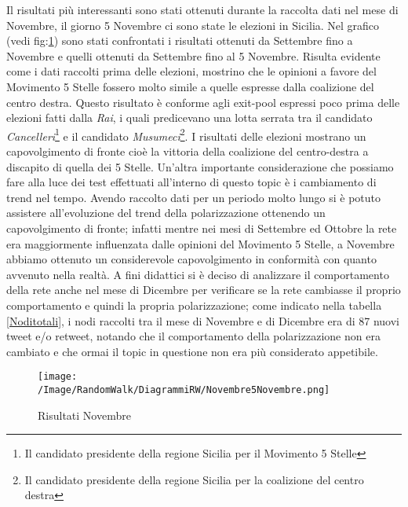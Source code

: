 Il risultati più interessanti sono stati ottenuti durante la raccolta dati nel mese di Novembre, il giorno 5 Novembre ci sono state le elezioni in Sicilia. Nel grafico (vedi fig:\ref{NovembrevsNovembre}) sono stati confrontati i risultati ottenuti da Settembre fino a Novembre e quelli ottenuti da Settembre fino al 5 Novembre. Risulta evidente come i dati raccolti prima delle elezioni, mostrino che le opinioni a favore del Movimento 5 Stelle fossero molto simile a quelle espresse dalla coalizione del centro destra. Questo risultato è conforme agli exit-pool espressi poco prima delle elezioni fatti dalla \textit{Rai}, i quali predicevano una lotta serrata tra il candidato \textit{Cancelleri}\footnote{Il candidato presidente della regione Sicilia per il Movimento 5 Stelle} e il candidato \textit{Musumeci}\footnote{Il candidato presidente della regione Sicilia per la coalizione del centro destra}.\cite{ElezioniRisultati}
I risultati delle elezioni mostrano un capovolgimento di fronte cioè la vittoria della coalizione del centro-destra a discapito di quella dei 5 Stelle. Un'altra importante considerazione che possiamo fare alla luce dei test effettuati all'interno di questo topic è i cambiamento di trend nel tempo. Avendo raccolto dati per un periodo molto lungo si è potuto assistere all'evoluzione del trend della polarizzazione ottenendo un capovolgimento di fronte; infatti mentre nei mesi di Settembre ed Ottobre la rete era maggiormente influenzata dalle opinioni del Movimento 5 Stelle, a Novembre abbiamo ottenuto un considerevole capovolgimento in conformità con quanto avvenuto nella realtà.
A fini didattici si è deciso di analizzare il comportamento della rete anche nel mese di Dicembre per verificare se la rete cambiasse il proprio comportamento e quindi la propria polarizzazione; come indicato nella tabella \ref{Noditotali}, i nodi raccolti tra il mese di Novembre e di Dicembre era di 87 nuovi tweet e/o retweet, notando che il comportamento della polarizzazione non era cambiato e che ormai il topic in questione non era più considerato appetibile.
\begin{figure}[!ht]
\centering
\texttt{[image: /Image/RandomWalk/DiagrammiRW/Novembre5Novembre.png]}
\caption{Risultati Novembre}
\label{NovembrevsNovembre}
\end{figure}

